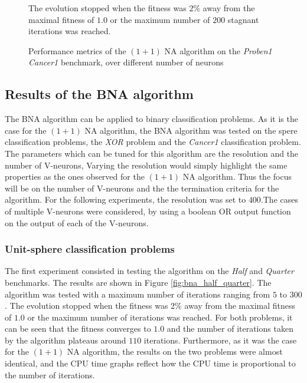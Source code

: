 \begin{figure}
\begin{center}
    \end{center}
    \caption{Performance metrics of the $(1 + 1)$ NA algorithm on the \textit{Proben1 Cancer1} benchmark, over different number of neurons}
    {The evolution stopped when the fitness was $2\%$ away from the maximal fitness of $1.0$ or the maximum number of $200$ stagnant iterations was reached.}
    \label{fig:na_proben1}
\end{figure}

\subsection{Results of the BNA algorithm}

The BNA algorithm can be applied to binary classification problems. As it is the case for the $(1 + 1)$ NA algorithm, the BNA algorithm was tested on the spere classification problems,
the \textit{XOR} problem and the \textit{Cancer1} classification problem. The parameters which can be tuned for this algorithm are the resolution and the number of V-neurons,
Varying the resolution would simply highlight the same properties as the ones observed for the $(1 + 1)$ NA algorithm. Thus the focus will be on the number of V-neurons and the the termination
criteria for the algorithm. For the following experiments, the resolution was set to $400$.The cases of multiple V-neurons were considered, by using a boolean OR output function on the output of each of the
V-neurons.

\subsubsection{Unit-sphere classification problems}

The first experiment consisted in testing the algorithm on the \textit{Half} and \textit{Quarter} benchmarks. The results are shown in Figure \ref{fig:bna_half_quarter}. The algorithm
was tested with a maximum number of iterations ranging from $5$ to $300$. The evolution stopped when the fitness was $2\%$ away from the maximal fitness of $1.0$ or the maximum number
of iterations was reached. For both problems, it can be seen that the fitness converges to $1.0$ and the number of iterations taken by the algorithm plateaus around $110$ iterations. Furthermore,
as it was the case for the $(1 + 1)$ NA algorithm, the results on the two problems were almost identical, and the CPU time graphs reflect how the CPU time is proportional to the number of iterations.

